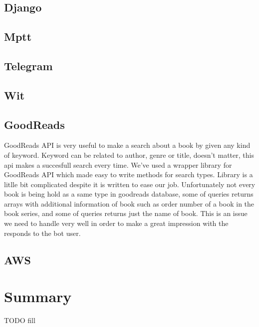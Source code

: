 \documentclass[a4paper]{article}
\begin{document}
\subsection{Django}
\subsection{Mptt}
\subsection{Telegram}
\subsection{Wit}
\subsection{GoodReads}

\quad GoodReads API is very useful to make a search about a book by given any kind of keyword. Keyword can be related to author, genre or title, doesn't matter, this api makes a succesfull search every time. We've used a wrapper library for GoodReads API which made easy to write methods for search types. Library is a litlle bit complicated despite it is written to ease our job. Unfortunately not every book is being hold as a same type in goodreads database, some of queries returns arrays with additional information of book such as order number of a book in the book series, and some of queries returns just the name of book. This is an issue we need to handle very well in order to make a great impression with the responds to the bot user.  
\subsection{AWS}

\section{Summary}
TODO fill
\end{document}
